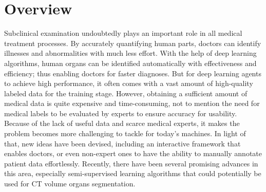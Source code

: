\section{Overview}
\label{sec:overview}
Subclinical examination undoubtedly plays an important role in all medical treatment processes. By accurately quantifying human parts, doctors can identify illnesses and abnormalities with much less effort.  With the help of deep learning algorithms, human organs can be identified automatically with effectiveness and efficiency; thus enabling doctors for faster diagnoses. But for deep learning agents to achieve high performance, it often comes with a vast amount of high-quality labeled data for the training stage. 
However, obtaining a sufficient amount of medical data is quite expensive and time-consuming, not to mention the need for medical labels to be evaluated by experts to ensure accuracy for usability. Because of the lack of useful data and scarce medical experts, it makes the problem becomes more challenging to tackle for today's machines. In light of that, new ideas have been devised, including an interactive framework that enables doctors, or even non-expert ones to have the ability to manually annotate patient data effortlessly. Recently, there have been several promising advances in this area, especially semi-supervised learning algorithms that could potentially be used for CT volume organs segmentation.

